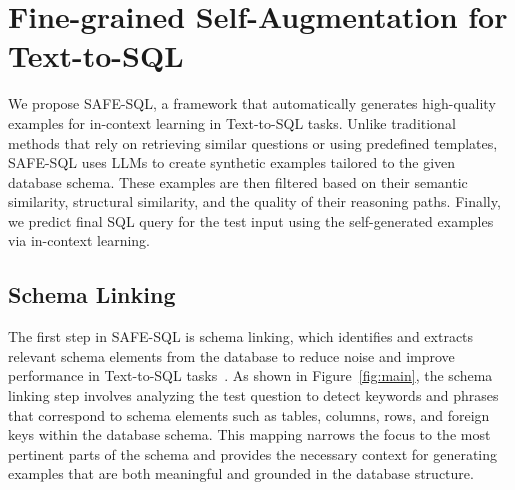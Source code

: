 




\section{Fine-grained Self-Augmentation for Text-to-SQL}
We propose SAFE-SQL, a framework that automatically generates high-quality examples for in-context learning in Text-to-SQL tasks. 
Unlike traditional methods that rely on retrieving similar questions or using predefined templates, SAFE-SQL uses LLMs to create synthetic examples tailored to the given database schema.
These examples are then filtered based on their semantic similarity, structural similarity, and the quality of their reasoning paths.
Finally, we predict final SQL query for the test input using the self-generated examples via in-context learning.

\subsection{Schema Linking}

The first step in SAFE-SQL is schema linking, which identifies and extracts relevant schema elements from the database to reduce noise and improve performance in Text-to-SQL tasks~\cite{robust_schema_linking}.
As shown in Figure~\ref{fig:main}, the schema linking step involves analyzing the test question to detect keywords and phrases that correspond to schema elements such as tables, columns, rows, and foreign keys within the database schema.
This mapping narrows the focus to the most pertinent parts of the schema and provides the necessary context for generating examples that are both meaningful and grounded in the database structure. 
